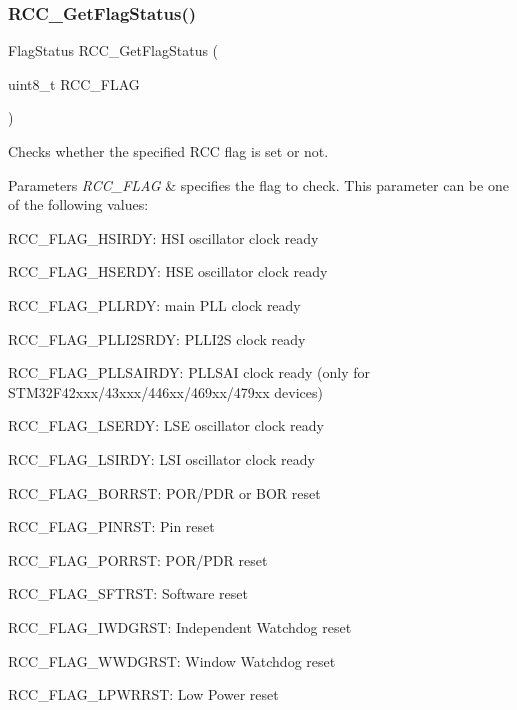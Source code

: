 \subsubsection{\texorpdfstring{R\+C\+C\+\_\+\+Get\+Flag\+Status()}{RCC\_GetFlagStatus()}}
{\footnotesize\ttfamily Flag\+Status R\+C\+C\+\_\+\+Get\+Flag\+Status (\begin{DoxyParamCaption}\item[{uint8\+\_\+t}]{R\+C\+C\+\_\+\+F\+L\+AG }\end{DoxyParamCaption})}



Checks whether the specified R\+CC flag is set or not. 


\begin{DoxyParams}{Parameters}
{\em R\+C\+C\+\_\+\+F\+L\+AG} & specifies the flag to check. This parameter can be one of the following values\+: \begin{DoxyItemize}
\item R\+C\+C\+\_\+\+F\+L\+A\+G\+\_\+\+H\+S\+I\+R\+DY\+: H\+SI oscillator clock ready \item R\+C\+C\+\_\+\+F\+L\+A\+G\+\_\+\+H\+S\+E\+R\+DY\+: H\+SE oscillator clock ready \item R\+C\+C\+\_\+\+F\+L\+A\+G\+\_\+\+P\+L\+L\+R\+DY\+: main P\+LL clock ready \item R\+C\+C\+\_\+\+F\+L\+A\+G\+\_\+\+P\+L\+L\+I2\+S\+R\+DY\+: P\+L\+L\+I2S clock ready \item R\+C\+C\+\_\+\+F\+L\+A\+G\+\_\+\+P\+L\+L\+S\+A\+I\+R\+DY\+: P\+L\+L\+S\+AI clock ready (only for S\+T\+M32\+F42xxx/43xxx/446xx/469xx/479xx devices) \item R\+C\+C\+\_\+\+F\+L\+A\+G\+\_\+\+L\+S\+E\+R\+DY\+: L\+SE oscillator clock ready \item R\+C\+C\+\_\+\+F\+L\+A\+G\+\_\+\+L\+S\+I\+R\+DY\+: L\+SI oscillator clock ready \item R\+C\+C\+\_\+\+F\+L\+A\+G\+\_\+\+B\+O\+R\+R\+ST\+: P\+O\+R/\+P\+DR or B\+OR reset \item R\+C\+C\+\_\+\+F\+L\+A\+G\+\_\+\+P\+I\+N\+R\+ST\+: Pin reset \item R\+C\+C\+\_\+\+F\+L\+A\+G\+\_\+\+P\+O\+R\+R\+ST\+: P\+O\+R/\+P\+DR reset \item R\+C\+C\+\_\+\+F\+L\+A\+G\+\_\+\+S\+F\+T\+R\+ST\+: Software reset \item R\+C\+C\+\_\+\+F\+L\+A\+G\+\_\+\+I\+W\+D\+G\+R\+ST\+: Independent Watchdog reset \item R\+C\+C\+\_\+\+F\+L\+A\+G\+\_\+\+W\+W\+D\+G\+R\+ST\+: Window Watchdog reset \item R\+C\+C\+\_\+\+F\+L\+A\+G\+\_\+\+L\+P\+W\+R\+R\+ST\+: Low Power reset \end{DoxyItemize}
\\
\hline
\end{DoxyParams}

